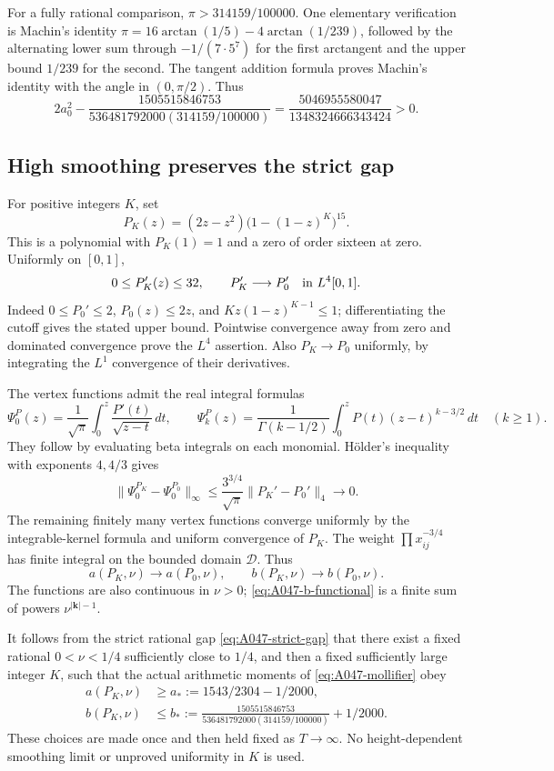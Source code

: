 For a fully rational comparison, \(\pi>314159/100000\).
One elementary verification is Machin's identity
\(\pi=16\arctan(1/5)-4\arctan(1/239)\), followed by
the alternating lower sum through \(-1/(7\cdot5^7)\)
for the first arctangent and the upper bound \(1/239\)
for the second.  The tangent addition formula proves
Machin's identity with the angle in \((0,\pi/2)\).
Thus
\begin{equation}\label{eq:A047-strict-gap}
 2a_0^2-
 \frac{1505515846753}
      {536481792000(314159/100000)}
       =\frac{5046955580047}{1348324666343424}>0 .
\end{equation}

\subsection*{High smoothing preserves the strict gap}

For positive integers \(K\), set
\[
             P_K(z)=(2z-z^2)\bigl(1-(1-z)^K\bigr)^{15}.
\]
This is a polynomial with \(P_K(1)=1\) and a zero of
order sixteen at zero.  Uniformly on \([0,1]\),
\[
 0\le P_K'(z)\le32,\qquad
 P_K'\longrightarrow P_0'\quad\hbox{in }L^4[0,1].
\]
Indeed \(0\le P_0'\le2\), \(P_0(z)\le2z\), and
\(Kz(1-z)^{K-1}\le1\); differentiating the cutoff gives
the stated upper bound.  Pointwise convergence away
from zero and dominated convergence prove the \(L^4\)
assertion.  Also \(P_K\to P_0\) uniformly, by integrating
the \(L^1\) convergence of their derivatives.

The vertex functions admit the real integral formulas
\[
 \Psi_0^P(z)=\frac1{\sqrt\pi}
       \int_0^z\frac{P'(t)}{\sqrt{z-t}}\,dt,\qquad
 \Psi_k^P(z)=\frac1{\Gamma(k-1/2)}
       \int_0^zP(t)(z-t)^{k-3/2}\,dt\quad(k\ge1).
\]
They follow by evaluating beta integrals on each monomial.
Hölder's inequality with exponents \(4,4/3\) gives
\[
 \|\Psi_0^{P_K}-\Psi_0^{P_0}\|_\infty
       \le\frac{3^{3/4}}{\sqrt\pi}
                             \|P_K'-P_0'\|_4\longrightarrow0.
\]
The remaining finitely many vertex functions converge
uniformly by the integrable-kernel formula and uniform
convergence of \(P_K\).  The weight
\(\prod x_{ij}^{-3/4}\) has finite integral on the bounded
domain \(\mathcal D\).  Thus
\[
 a(P_K,\nu)\longrightarrow a(P_0,\nu),\qquad
 b(P_K,\nu)\longrightarrow b(P_0,\nu).
\]
The functions are also continuous in \(\nu>0\);
\eqref{eq:A047-b-functional} is a finite sum of powers
\(\nu^{|\mathbf k|-1}\).

It follows from the strict rational gap
\eqref{eq:A047-strict-gap} that there exist a fixed
rational \(0<\nu<1/4\) sufficiently close to \(1/4\),
and then a fixed sufficiently large integer \(K\),
such that the actual arithmetic moments of
\eqref{eq:A047-mollifier} obey
\begin{align*}
 a(P_K,\nu)&\ge a_*:=1543/2304-1/2000,\\
 b(P_K,\nu)&\le b_*:=
 \frac{1505515846753}
      {536481792000(314159/100000)}+1/2000 .
\end{align*}
These choices are made once and then held fixed as
\(T\to\infty\).  No height-dependent smoothing limit
or unproved uniformity in \(K\) is used.

